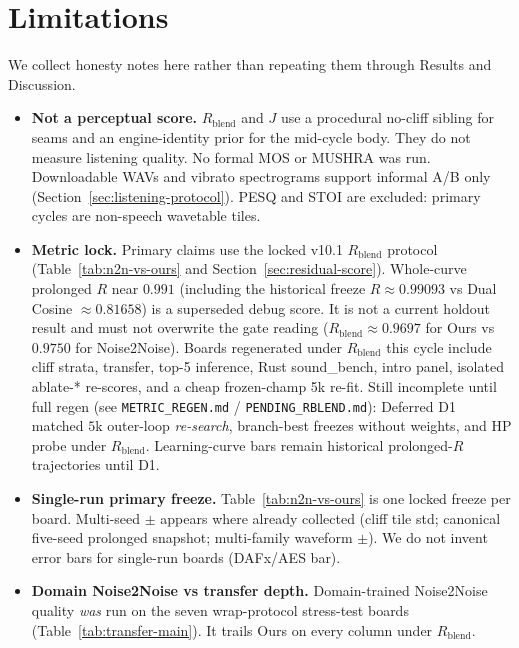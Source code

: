 \section{Limitations}
\label{sec:limitations}

We collect honesty notes here rather than repeating them through Results and Discussion.

\begin{itemize}
  \item \textbf{Not a perceptual score.}
    $R_{\mathrm{blend}}$ and $J$ use a procedural no-cliff sibling for seams and an engine-identity prior for the mid-cycle body.
    They do not measure listening quality.
    No formal MOS or MUSHRA was run.
    Downloadable WAVs and vibrato spectrograms support informal A/B only (Section~\ref{sec:listening-protocol}).
    PESQ and STOI are excluded: primary cycles are non-speech wavetable tiles.
  \item \textbf{Metric lock.}
    Primary claims use the locked v10.1 $R_{\mathrm{blend}}$ protocol
    (Table~\ref{tab:n2n-vs-ours} and Section~\ref{sec:residual-score}).
    Whole-curve prolonged $R$ near $0.991$ (including the historical freeze $R{\approx}0.99093$ vs Dual Cosine ${\approx}0.81658$)
    is a superseded debug score.
    It is not a current holdout result and must not overwrite the gate reading
    ($R_{\mathrm{blend}}{\approx}0.9697$ for Ours vs $0.9750$ for Noise2Noise).
    Boards regenerated under $R_{\mathrm{blend}}$ this cycle include cliff strata, transfer, top-5 inference,
    Rust sound\_bench, intro panel, isolated ablate-* re-scores, and a cheap frozen-champ 5k re-fit.
    Still incomplete until full regen (see \texttt{METRIC\_REGEN.md} / \texttt{PENDING\_RBLEND.md}):
    Deferred D1 matched $5$k outer-loop \emph{re-search}, branch-best freezes without weights, and HP probe under $R_{\mathrm{blend}}$.
    Learning-curve bars remain historical prolonged-$R$ trajectories until D1.
  \item \textbf{Single-run primary freeze.}
    Table~\ref{tab:n2n-vs-ours} is one locked freeze per board.
    Multi-seed $\pm$ appears where already collected (cliff tile std; canonical five-seed prolonged snapshot; multi-family waveform $\pm$).
    We do not invent error bars for single-run boards (DAFx/AES bar).
  \item \textbf{Domain Noise2Noise vs transfer depth.}
    Domain-trained Noise2Noise quality \emph{was} run on the seven wrap-protocol stress-test boards
    (Table~\ref{tab:transfer-main}). It trails Ours on every column under $R_{\mathrm{blend}}$.

\end{itemize}
